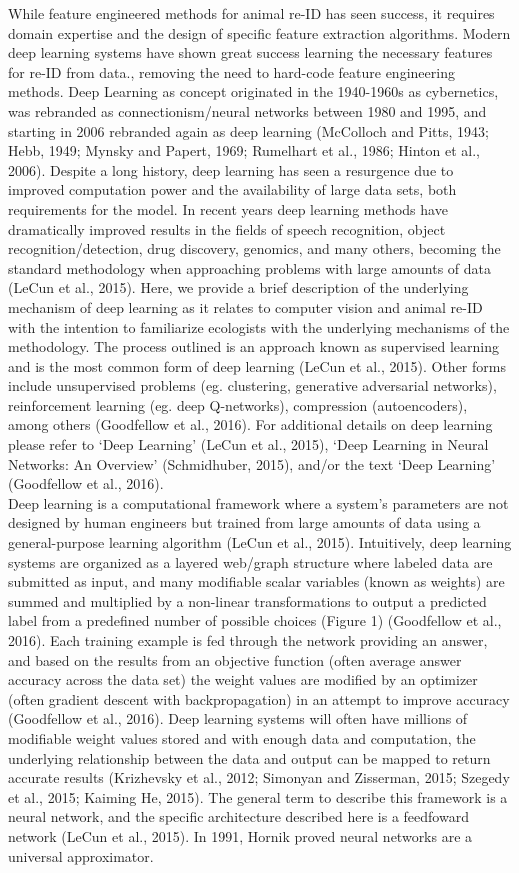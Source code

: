 \documentclass[11pt]{article}
\begin{document}
While feature engineered methods for animal re-ID has seen success, it requires domain expertise and the design of specific feature extraction algorithms. Modern deep learning systems have shown great success learning the necessary features for re-ID from data., removing the need to hard-code feature engineering methods. Deep Learning as concept originated in the 1940-1960s as cybernetics, was rebranded as connectionism/neural networks between 1980 and 1995, and starting in 2006 rebranded again as deep learning (McColloch and Pitts, 1943; Hebb, 1949; Mynsky and Papert, 1969; Rumelhart et al., 1986; Hinton et al., 2006). Despite a long history, deep learning has seen a resurgence due to improved computation power and the availability of large data sets, both requirements for the model. In recent years deep learning methods have dramatically improved results in the fields of speech recognition, object recognition/detection, drug discovery, genomics, and many others, becoming the standard methodology when approaching problems with large amounts of data (LeCun et al., 2015). Here, we provide a brief description of the underlying mechanism of deep learning as it relates to computer vision and animal re-ID with the intention to familiarize ecologists with the underlying mechanisms of the methodology. The process outlined is an approach known as supervised learning and is the most common form of deep learning (LeCun et al., 2015). Other forms include unsupervised problems (eg. clustering, generative adversarial networks), reinforcement learning (eg. deep Q-networks), compression (autoencoders), among others (Goodfellow et al., 2016). For additional details on deep learning please refer to `Deep Learning' (LeCun et al., 2015), `Deep Learning in Neural Networks: An Overview' (Schmidhuber, 2015), and/or the text `Deep Learning' (Goodfellow et al., 2016).
\newline
\\
Deep learning is a computational framework where a system's parameters are not designed by human engineers but trained from large amounts of data using a general-purpose learning algorithm (LeCun et al., 2015). Intuitively, deep learning systems are organized as a layered web/graph structure where labeled data are submitted as input, and many modifiable scalar variables (known as weights) are summed and multiplied by a non-linear transformations to output a predicted label from a predefined number of possible choices (Figure 1) (Goodfellow et al., 2016). Each training example is fed through the network providing an answer, and based on the results from an objective function (often average answer accuracy across the data set) the weight values are modified by an optimizer (often gradient descent with backpropagation) in an attempt to improve accuracy (Goodfellow et al., 2016). Deep learning systems will often have millions of modifiable weight values stored and with enough data and computation, the underlying relationship between the data and output can be mapped to return accurate results (Krizhevsky et al., 2012; Simonyan and Zisserman, 2015; Szegedy et al., 2015; Kaiming He, 2015). The general term to describe this framework is a neural network, and the specific architecture described here is a feedfoward network (LeCun et al., 2015). In 1991, Hornik proved neural networks are a universal approximator.
\end{document}
